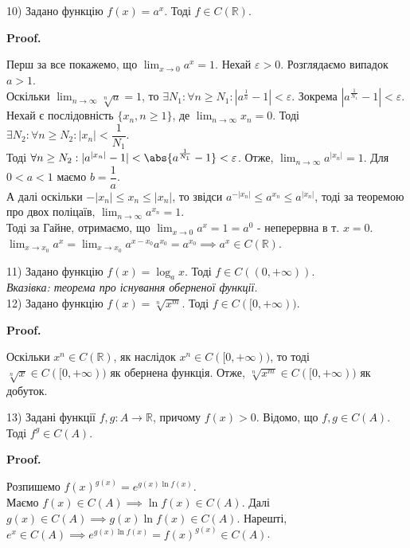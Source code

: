 \documentclass[a4paper, 14pt]{article}
\makeatletter
\def\qed{$\blacksquare$}
\theoremstyle{theoremdd}
\theoremstyle{theoremdd}
\theoremstyle{theoremdd}
\theoremstyle{theoremdd}
\theoremstyle{theoremdd}
\theoremstyle{theoremdd}
\theoremstyle{theoremdd}
\theoremstyle{theoremdd}
\renewenvironment{proof}[1][Proof.\\]{\par
\pushQED{\hfill \qed}%
\normalfont \topsep6\p@\@plus6\p@\relax
\trivlist
\item\relax
{\bfseries
#1\@addpunct{.}}\hspace\labelsep\ignorespaces
}{%
\popQED\endtrivlist\@endpefalse
}
\makeatother
\begin{document}
10) Задано функцію $f(x) = a^x$. Тоді $f \in C(\mathbb{R})$.

\begin{proof}
Перш за все покажемо, що $\displaystyle\lim_{x \to 0} a^x = 1$. Нехай $\varepsilon > 0$. Розглядаємо випадок $a > 1$.\\
Оскільки $\displaystyle\lim_{n \to \infty} \sqrt[n]{a} = 1$, то $\exists N_1: \forall n \geq N_1: |a^{\frac{1}{n}} - 1| < \varepsilon$. Зокрема $|a^{\frac{1}{N_1}} - 1| < \varepsilon$.\\
Нехай є послідовність $\{x_n, n \geq 1\}$, де $\displaystyle\lim_{n \to \infty} x_n =0$. Тоді $\exists N_2: \forall n \geq N_2: |x_n| < \dfrac{1}{N_1}$.\\
Тоді $\forall n \geq N_2: |a^{|x_n|} - 1| < \abs{a^{\frac{1}{N_1}} - 1} < \varepsilon$. Отже, $\displaystyle\lim_{n \to \infty} a^{|x_n|} = 1$. Для $0 < a < 1$ маємо $b = \dfrac{1}{a}$.\\
А далі оскільки $-|x_n| \leq x_n \leq |x_n|$, то звідси $a^{-|x_n|} \leq a^{x_n} \leq a^{|x_n|}$, тоді за теоремою про двох поліцаїв, $\displaystyle\lim_{n \to \infty} a^{x_n} = 1$.\\
Тоді за Гайне, отримаємо, що $\displaystyle\lim_{x \to 0} a^x = 1 = a^0$ - неперервна в т. $x = 0$.
\bigskip \\
$\displaystyle\lim_{x \to x_0} a^x = \lim_{x \to x_0} a^{x-x_0} a^{x_0} = a^{x_0} \implies a^x \in C(\mathbb{R})$.
\end{proof}

11) Задано функцію $f(x) = \log_a x$. Тоді $f \in C((0,+\infty))$.\\
\textit{Вказівка: теорема про існування оберненої функції.}
\bigskip \\

12) Задано функцію $f(x) = \sqrt[n]{x^m}$. Тоді $f \in C([0,+\infty))$.
\begin{proof}
Оскільки $x^n \in C(\mathbb{R})$, як наслідок $x^n \in C([0,+\infty))$, то тоді $\sqrt[n]{x} \in C([0,+\infty))$ як обернена функція. Отже, $\sqrt[n]{x^m} \in C([0,+\infty))$ як добуток.
\end{proof}

13) Задані функції $f,g \colon A \to \mathbb{R}$, причому $f(x) > 0$. Відомо, що $f,g \in C(A)$. Тоді $f^g \in C(A)$.

\begin{proof}
	Розпишемо $f(x)^{g(x)} = e^{g(x) \ln f(x)}$.\\
	Маємо $f(x) \in C(A) \implies \ln f(x) \in C(A)$. Далі $g(x) \in C(A) \implies g(x) \ln f(x) \in C(A)$. Нарешті, $e^x \in C(A) \implies e^{g(x) \ln f(x)} = f(x)^{g(x)} \in C(A)$.
\end{proof}
\end{document}

